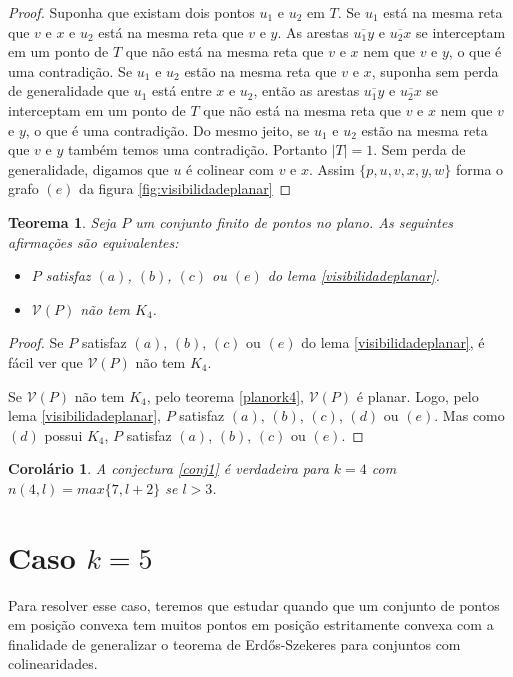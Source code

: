 \documentclass[a4paper]{book}
\newtheorem{teorema}{Teorema}
\newtheorem{corolario}{Corolário}[teorema]
\begin{document}
\begin{proof}
    Suponha que existam dois pontos $u_1$ e $u_2$ em $T$. Se $u_1$ está na mesma reta que $v$ e $x$ e $u_2$ está na mesma reta que $v$ e $y$. As arestas $\overline{u_1y}$ e $\overline{u_2x}$ se interceptam em um ponto de $T$ que não está na mesma reta que $v$ e $x$ nem que $v$ e $y$, o que é uma contradição. Se $u_1$ e $u_2$ estão na mesma reta que $v$ e $x$, suponha sem perda de generalidade que $u_1$ está entre $x$ e $u_2$, então as arestas $\overline{u_1y}$ e $\overline{u_2x}$ se interceptam em um ponto de $T$ que não está na mesma reta que $v$ e $x$ nem que $v$ e $y$, o que é uma contradição. Do mesmo jeito, se $u_1$ e $u_2$ estão na mesma reta que $v$ e $y$ também temos uma contradição. Portanto $|T|=1$. Sem perda de generalidade, digamos que $u$ é colinear com $v$ e $x$. Assim $\{p,u,v,x,y,w\}$ forma o grafo $(e)$ da figura \ref{fig:visibilidadeplanar}
\end{proof}
\begin{teorema}
    Seja $P$ um conjunto finito de pontos no plano. As seguintes afirmações são equivalentes:
    \begin{itemize}
        \item
            $P$ satisfaz $(a)$, $(b)$, $(c)$ ou $(e)$ do lema \ref{visibilidadeplanar}.
        \item
            $\mathcal V(P)$ não tem $K_4$.
    \end{itemize}
\end{teorema}
\begin{proof}
    Se $P$ satisfaz $(a)$, $(b)$, $(c)$ ou $(e)$ do lema \ref{visibilidadeplanar}, é fácil ver que $\mathcal V(P)$ não tem $K_4$.

    Se $\mathcal V(P)$ não tem $K_4$, pelo teorema \ref{planork4}, $\mathcal V(P)$ é planar. Logo, pelo lema \ref{visibilidadeplanar}, $P$ satisfaz $(a)$, $(b)$, $(c)$, $(d)$ ou $(e)$. Mas como $(d)$ possui $K_4$, $P$ satisfaz $(a)$, $(b)$, $(c)$ ou $(e)$.
\end{proof}

\begin{corolario}
    A conjectura \ref{conj1} é verdadeira para $k=4$ com $n(4,l)=max\{7,l+2\}$ se $l>3$.
\end{corolario}

\section{Caso $k=5$}
Para resolver esse caso, teremos que estudar quando que um conjunto de pontos em posição convexa tem muitos pontos em posição estritamente convexa com a finalidade de generalizar o teorema de Erd\H os-Szekeres para conjuntos com colinearidades.
\end{document}
